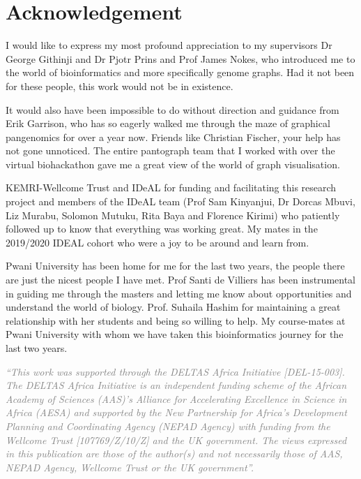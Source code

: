 \documentclass[10pt, a4paper]{article}
\begin{document}
\newpage
\section{Acknowledgement}
\label{sec:orgf70244d}
I would like to express my most profound appreciation to my supervisors
Dr George Githinji and Dr Pjotr Prins and Prof James Nokes, who introduced me to
the world of bioinformatics and more specifically genome graphs. Had it not been
for these people, this work would not be in existence.

It would also have been impossible to do without direction and guidance from
Erik Garrison, who has so eagerly walked me through the maze of graphical
pangenomics for over a year now. Friends like Christian Fischer, your help has
not gone unnoticed. The entire pantograph team that I worked with over the
virtual biohackathon gave me a great view of the world of graph visualisation.

KEMRI-Wellcome Trust and IDeAL for funding and facilitating this research
project and members of the IDeAL team (Prof Sam Kinyanjui, Dr Dorcas Mbuvi,
Liz Murabu, Solomon Mutuku, Rita Baya and Florence Kirimi) who patiently
followed up to know that everything was working great. My mates in the 2019/2020
IDEAL cohort who were a joy to be around and learn from.

Pwani University has been home for me for the last two years, the people there
are just the nicest people I have met. Prof Santi de Villiers has been
instrumental in guiding me through the masters and letting me know about
opportunities and understand the world of biology.
Prof. Suhaila Hashim for maintaining a great relationship with her students and
being so willing to help. My course-mates at Pwani University with whom we have
taken this bioinformatics journey for the last two years.

\textcolor{gray}{\emph{
“This work was supported through the DELTAS Africa Initiative [DEL-15-003].
The DELTAS Africa Initiative is an independent funding scheme of the
African Academy of Sciences (AAS)'s Alliance for Accelerating Excellence in
Science in Africa (AESA) and supported by the New Partnership for Africa's
Development Planning and Coordinating Agency (NEPAD Agency) with funding from
the Wellcome Trust [107769/Z/10/Z] and the UK government.
The views expressed in this publication are those of the author(s) and not
necessarily those of AAS, NEPAD Agency, Wellcome Trust or the UK government”.
}}

\newpage
\pagewidth
\end{document}
